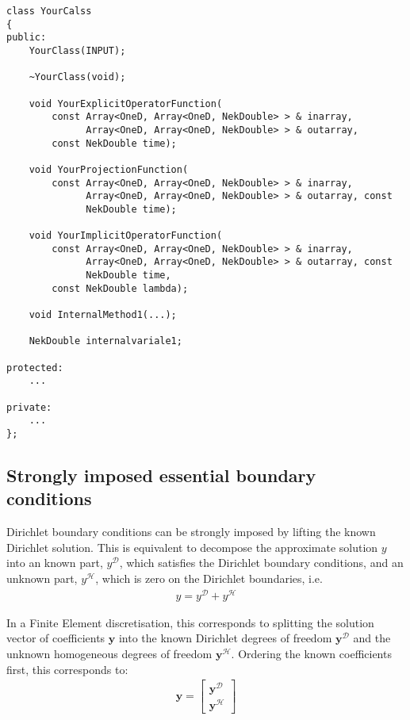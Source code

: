 \begin{lstlisting}[style=C++Style]
class YourCalss
{ 
public:
    YourClass(INPUT);
    
    ~YourClass(void);

    void YourExplicitOperatorFunction(
        const Array<OneD, Array<OneD, NekDouble> > & inarray,
              Array<OneD, Array<OneD, NekDouble> > & outarray,
        const NekDouble time);

    void YourProjectionFunction(
        const Array<OneD, Array<OneD, NekDouble> > & inarray,
              Array<OneD, Array<OneD, NekDouble> > & outarray, const
              NekDouble time);

    void YourImplicitOperatorFunction(
        const Array<OneD, Array<OneD, NekDouble> > & inarray,
              Array<OneD, Array<OneD, NekDouble> > & outarray, const
              NekDouble time,
        const NekDouble lambda);
    
    void InternalMethod1(...);

    NekDouble internalvariale1;

protected:
    ...

private:
    ...
};
\end{lstlisting}

 
\subsection{Strongly imposed essential boundary conditions}
Dirichlet boundary conditions can be strongly imposed by lifting the known
Dirichlet solution.
This is equivalent to decompose the approximate solution $y$ into an
known part, $y^{\mathcal{D}}$, which satisfies the Dirichlet boundary
conditions, and an unknown part, $y^{\mathcal{H}}$, which is zero on
the Dirichlet boundaries, i.e.
\begin{align*}
y = y^{\mathcal{D}} + y^{\mathcal{H}}
\end{align*}

In a Finite Element discretisation, this corresponds to splitting the solution
vector of coefficients $\boldsymbol{y}$ into the known Dirichlet
degrees of freedom $\boldsymbol{y}^{\mathcal{D}}$ and the unknown
homogeneous degrees of freedom $\boldsymbol{y}^{\mathcal{H}}$.
Ordering the known coefficients first, this corresponds to:
\begin{align*}
\boldsymbol{y} = \left[ \begin{array}{c}
\boldsymbol{y}^{\mathcal{D}} \\
\boldsymbol{y}^{\mathcal{H}} \end{array} \right]
\end{align*}

